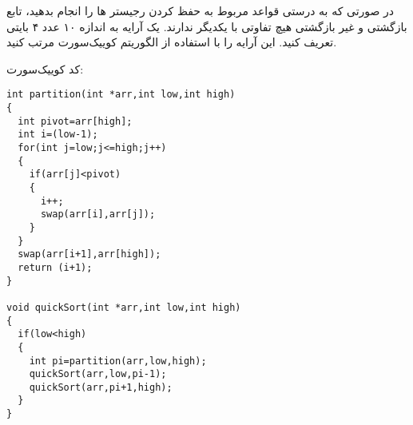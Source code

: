     \item در صورتی که به درستی قواعد مربوط به حفظ کردن رجیستر ها را انجام بدهید، تابع بازگشتی و غیر بازگشتی هیچ تفاوتی با یکدیگر ندارند. یک آرایه به اندازه ۱۰ عدد ۴ بایتی تعریف کنید. این آرایه را با استفاده از الگوریتم کوییک‌سورت مرتب کنید.

    
کد کوییک‌سورت:
\begin{latin}
\begin{lstlisting}
int partition(int *arr,int low,int high)
{
  int pivot=arr[high];
  int i=(low-1);
  for(int j=low;j<=high;j++)
  {
    if(arr[j]<pivot)
    {
      i++;
      swap(arr[i],arr[j]);
    }
  }
  swap(arr[i+1],arr[high]);
  return (i+1);
}
         
void quickSort(int *arr,int low,int high)
{
  if(low<high)
  {
    int pi=partition(arr,low,high);
    quickSort(arr,low,pi-1);
    quickSort(arr,pi+1,high);
  }
}
\end{lstlisting}
\end{latin}
